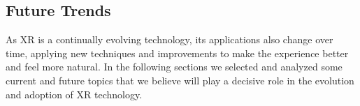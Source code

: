


\subsection{Future Trends}
\label{subsec:background-xr-future}
As XR is a continually evolving technology, its applications also change over time, applying new techniques and improvements to make the experience better and feel more natural. In the following sections we selected and analyzed some current and future topics that we believe will play a decisive role in the evolution and adoption of XR technology.
